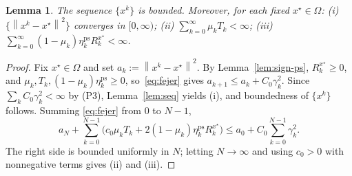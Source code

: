\documentclass[]{interact}
\theoremstyle{plain}
\newtheorem{lemma}[theorem]{Lemma}
\theoremstyle{definition}
\theoremstyle{remark}
\newcommand{\norm}[1]{\left\lVert #1 \right\rVert}
\newcommand{\ps}{\mathrm{ps}}
\begin{document}
\begin{lemma}\label{lem:bounded}
The sequence $\{x^k\}$ is bounded. Moreover, for each fixed $x^\star\in\Omega$: \textup{(i)} $\{\norm{x^k-x^\star}^2\}$ converges in $[0,\infty)$; \textup{(ii)} $\sum_{k=0}^\infty\mu_k T_k<\infty$; \textup{(iii)} $\sum_{k=0}^\infty(1-\mu_k)\eta^{\ps}_k R^{x^\star}_k<\infty$.
\end{lemma}
\begin{proof}
Fix $x^\star\in\Omega$ and set $a_k:=\norm{x^k-x^\star}^2$. By Lemma~\ref{lem:sign-ps}, $R^{x^\star}_k\ge0$, and $\mu_k,T_k,(1-\mu_k)\eta^{\ps}_k\ge0$, so~\eqref{eq:fejer} gives $a_{k+1}\le a_k+C_0\gamma_k^2$. Since $\sum_k C_0\gamma_k^2<\infty$ by (P3), Lemma~\ref{lem:seq} yields (i), and boundedness of $\{x^k\}$ follows. Summing \eqref{eq:fejer} from $0$ to $N-1$,
\[
a_N+\sum_{k=0}^{N-1}\bigl(c_0\mu_k T_k+2(1-\mu_k)\eta^{\ps}_k R^{x^\star}_k\bigr)\le a_0+C_0\sum_{k=0}^{N-1}\gamma_k^2 .
\]
The right side is bounded uniformly in $N$; letting $N\to\infty$ and using $c_0>0$ with nonnegative terms gives (ii) and (iii).
\end{proof}
\end{document}
